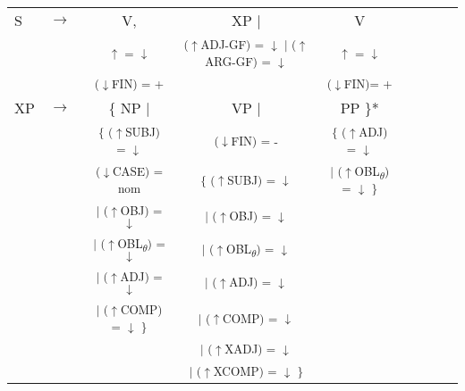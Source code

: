 \documentclass[12pt,a4paper]{article}
\begin{document}
\begin{singlespace}
\begin{tabular}{ l  l  c  c  c  c  c  c  c}
S & $\rightarrow$ & V, & XP $\mid$ & V \\
   & $\qquad$ & \textsuperscript{$\uparrow$ = $\downarrow$} & \textsuperscript{($\uparrow$ADJ-GF) = $\downarrow$ $\mid$ ($\uparrow$ARG-GF) = $\downarrow$} &  \textsuperscript{$\uparrow$ = $\downarrow$} \\
      & $\qquad$ & \textsuperscript{($\downarrow$FIN) = +} & &  \textsuperscript{($\downarrow$FIN)= +} \\
XP & $\rightarrow$ & \{ NP $\mid$ &  VP $\mid$ & PP \}* \\
   & $\qquad$ & \textsuperscript{\{ ($\uparrow$SUBJ) = $\downarrow$} &\textsuperscript{($\downarrow$FIN) = -} & \textsuperscript{\{ ($\uparrow$ADJ) = $\downarrow$} \\
    & $\qquad$ & \textsuperscript{($\downarrow$CASE) = nom} & \textsuperscript{\{ ($\uparrow$SUBJ) = $\downarrow$}  &  \textsuperscript{$\mid$ ($\uparrow$OBL\textsubscript{$\theta$}) = $\downarrow$ \}} \\
    & $\qquad$ & \textsuperscript{$\mid$ ($\uparrow$OBJ) = $\downarrow$} & \textsuperscript{$\mid$ ($\uparrow$OBJ) = $\downarrow$} &  \\
       & $\qquad$ & \textsuperscript{$\mid$ ($\uparrow$OBL\textsubscript{$\theta$}) = $\downarrow$} & \textsuperscript{$\mid$ ($\uparrow$OBL\textsubscript{$\theta$}) = $\downarrow$} & \\
         & $\qquad$ & \textsuperscript{$\mid$ ($\uparrow$ADJ) = $\downarrow$} & \textsuperscript{$\mid$ ($\uparrow$ADJ) = $\downarrow$} &  \\
           & $\qquad$ & \textsuperscript{$\mid$ ($\uparrow$COMP) = $\downarrow$ \}} & \textsuperscript{$\mid$ ($\uparrow$COMP) = $\downarrow$} &  \\
             & $\qquad$ & & \textsuperscript{$\mid$ ($\uparrow$XADJ) = $\downarrow$} &  \\
               & $\qquad$ & & \textsuperscript{$\mid$ ($\uparrow$XCOMP) = $\downarrow$ \} } &  \\

\end{tabular}
\end{singlespace}
\end{document}
